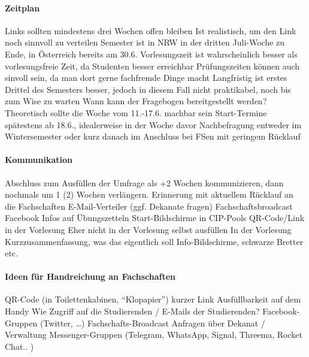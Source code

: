       \paragraph{Zeitplan}
        \begin{outline}
          \1 Links sollten mindestens drei Wochen offen bleiben
          \1 Ist realistisch, um den Link noch sinnvoll zu verteilen
          \1 Semester ist in NRW in der dritten Juli-Woche zu Ende, in Österreich bereits am 30.6.
          \1 Vorlesungszeit ist wahrscheinlich besser als vorlesungsfreie Zeit, da Studenten besser erreichbar
          \1 Prüfungszeiten können auch sinvoll sein, da man dort gerne fachfremde Dinge macht
          \1 Langfristig ist erstes Drittel des Semesters besser, jedoch in diesem Fall nicht praktikabel, noch bis zum Wise zu warten
          \1 Wann kann der Fragebogen bereitgestellt werden?
            \2 Theoretisch sollte die Woche vom 11.-17.6. machbar sein
          \1 Start-Termine
            \2 spätestens ab 18.6., idealerweise in der Woche davor
          \1 Nachbefragung entweder im Wintersemester oder kurz danach im Anschluss bei FSen mit geringem Rücklauf
        \end{outline}

      \paragraph{Kommunikation}
        \begin{outline}
          \1 Abschluss zum Ausfüllen der Umfrage als +2 Wochen kommunizieren, dann nochmals um 1 (2) Wochen verlängern.
          \1 Erinnerung mit aktuellem Rücklauf an die Fachschaften
          \1 E-Mail-Verteiler (ggf. Dekanate fragen)
          \1 Fachschaftsbroadcast
          \1 Facebook
          \1 Infos auf Übungszetteln
          \1 Start-Bildschirme in CIP-Pools
          \1 QR-Code/Link in der Vorlesung
            \2 Eher nicht in der Vorlesung selbst ausfüllen
            \2 In der Vorlesung Kurzzusammenfassung, was das eigentlich soll
          \1 Info-Bildschirme, schwarze Bretter etc.
        \end{outline}

      \paragraph{Ideen für Handreichung an Fachschaften}
        \begin{outline}
          \1 QR-Code (in Toilettenkabinen, “Klopapier”)
          \1 kurzer Link
          \1 Ausfüllbarkeit auf dem Handy
          \1 Wie Zugriff auf die Studierenden / E-Mails der Studierenden?
            \2 Facebook-Gruppen (Twitter, …)
            \2 Fachschafts-Broadcast
            \2 Anfragen über Dekanat / Verwaltung
            \2 Messenger-Gruppen (Telegram, WhatsApp, Signal, Threema, Rocket Chat.. )
        \end{outline}

